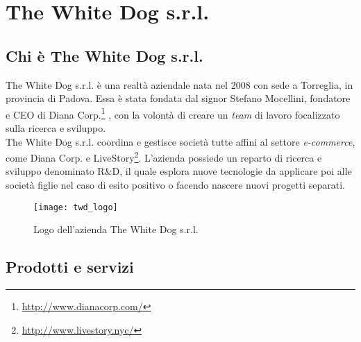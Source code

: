 \newpage
\chapter{The White Dog s.r.l.}
\label{cap:thewhitedog}

\section{Chi è The White Dog s.r.l.}

The White Dog s.r.l. è una realtà aziendale nata nel 2008 con sede a Torreglia, in provincia di Padova. Essa è stata fondata dal signor Stefano Mocellini, fondatore e CEO di Diana Corp.\footnote[1]{\url{http://www.dianacorp.com/}} , con la volontà di creare un \textit{team} di lavoro focalizzato sulla ricerca e sviluppo. \\
The White Dog s.r.l. coordina e gestisce società tutte affini al settore \textit{e-commerce}, come Diana Corp. e LiveStory\footnote[2]{\url{http://www.livestory.nyc/}}. L'azienda possiede un reparto di ricerca e sviluppo denominato R\&D, il quale esplora nuove tecnologie da applicare poi alle società figlie nel caso di esito positivo o facendo nascere nuovi progetti separati.

\label{The White Dog s.r.l.}
\begin{figure}[ht]
	\begin{center}
		\texttt{[image: twd\_logo]}
		\caption{Logo dell'azienda The White Dog s.r.l.}
	\end{center}
\end{figure}
\FloatBarrier

\section{Prodotti e servizi}

